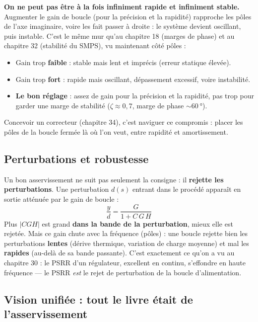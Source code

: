 \documentclass[12pt,a4paper,twoside]{book}
\begin{document}
\begin{attention}
\textbf{On ne peut pas être à la fois infiniment rapide et infiniment stable.} Augmenter le gain de boucle (pour la précision et la rapidité) rapproche les pôles de l'axe imaginaire, voire les fait passer à droite : le système devient oscillant, puis instable. C'est le même mur qu'au chapitre 18 (marges de phase) et au chapitre 32 (stabilité du SMPS), vu maintenant côté pôles :
\begin{itemize}[nosep]
\item Gain trop \textbf{faible} : stable mais lent et imprécis (erreur statique élevée).
\item Gain trop \textbf{fort} : rapide mais oscillant, dépassement excessif, voire instabilité.
\item \textbf{Le bon réglage} : assez de gain pour la précision et la rapidité, pas trop pour garder une marge de stabilité ($\zeta \approx 0{,}7$, marge de phase $\sim\SI{60}{°}$).
\end{itemize}
Concevoir un correcteur (chapitre 34), c'est naviguer ce compromis : placer les pôles de la boucle fermée là où l'on veut, entre rapidité et amortissement.
\end{attention}

\subsection{Perturbations et robustesse}

\begin{formule}
Un bon asservissement ne suit pas seulement la consigne : il \textbf{rejette les perturbations}. Une perturbation $d(s)$ entrant dans le procédé apparaît en sortie atténuée par le gain de boucle :
\[
\frac{y}{d} = \frac{G}{1 + C\,G\,H}
\]
Plus $|CGH|$ est grand \textbf{dans la bande de la perturbation}, mieux elle est rejetée. Mais ce gain chute avec la fréquence (pôles) : une boucle rejette bien les perturbations \textbf{lentes} (dérive thermique, variation de charge moyenne) et mal les \textbf{rapides} (au-delà de sa bande passante). C'est exactement ce qu'on a vu au chapitre 30 : le PSRR d'un régulateur, excellent en continu, s'effondre en haute fréquence --- le PSRR \textit{est} le rejet de perturbation de la boucle d'alimentation.
\end{formule}

\subsection{Vision unifiée : tout le livre était de l'asservissement}
\end{document}
